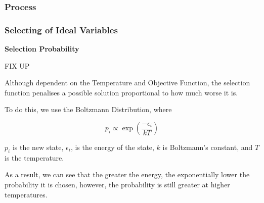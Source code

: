 \documentclass{article}
\begin{document}
\subsubsection{Process}



\subsubsection{Selecting of Ideal Variables}

\textbf{Selection Probability}

FIX UP

Although dependent on the Temperature and Objective Function, the selection function penalises a possible solution proportional to how much worse it is.

To do this, we use the Boltzmann Distribution, where

$$p_i \propto \exp \left( \frac{- \epsilon_i}{kT} \right)$$

$p_i$ is the new state, $\epsilon_i$, is the energy of the state, $k$ is Boltzmann's constant, and $T$ is the temperature.

As a result, we can see that the greater the energy, the exponentially lower the probability it is chosen, however, the probability is still greater at higher temperatures.
\end{document}
